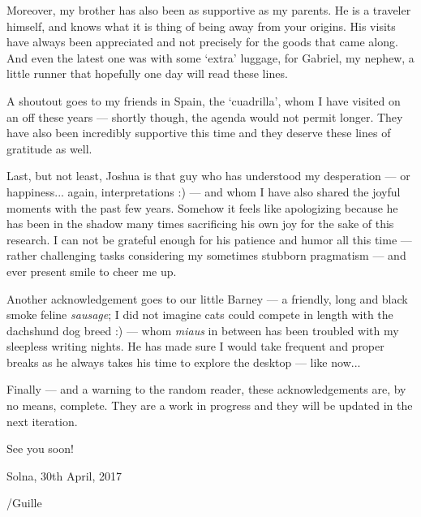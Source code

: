 Moreover, my brother has also been as supportive as my parents. He is a traveler 
himself, and knows what it is thing of being away from your origins. His visits 
have always been appreciated and not precisely for the goods that came along. And 
even the latest one was with some `extra' luggage, for Gabriel, my nephew, a little 
runner that hopefully one day will read these lines.

A shoutout goes to my friends in Spain, the `cuadrilla', whom I have visited on 
an off these years --- shortly though, the agenda would not permit longer. They 
have also been incredibly supportive this time and they deserve these lines of gratitude 
as well.

Last, but not least, Joshua is that guy who has understood my desperation --- or happiness... 
again, interpretations :) --- and whom I have also shared the joyful moments with 
the past few years. Somehow it feels like apologizing because he has been in the 
shadow many times sacrificing his own joy for the sake of this research. I can not 
be grateful enough for his patience and humor all this time --- rather challenging 
tasks considering my sometimes stubborn pragmatism --- and ever present smile to 
cheer me up.

Another acknowledgement goes to our little Barney --- a friendly, long and black 
smoke feline \emph{sausage}; I did not imagine cats could compete in length with 
the dachshund dog breed :) --- whom \emph{miaus} in between has been troubled with 
my sleepless writing nights. He has made sure I would take frequent and proper breaks 
as he always takes his time to explore the desktop --- like now...

Finally --- and a warning to the random reader, these acknowledgements are, by no 
means, complete. They are a work in progress and they will be updated in the next 
iteration.

See you soon!

\vspace{1.5em}

\hfill\begin{minipage}[t]{0.33\textwidth}
        \begin{center}
            Solna, 30th April, 2017
            
            \vspace{0.75em}
            
            /Guille
        \end{center}
\end{minipage}


